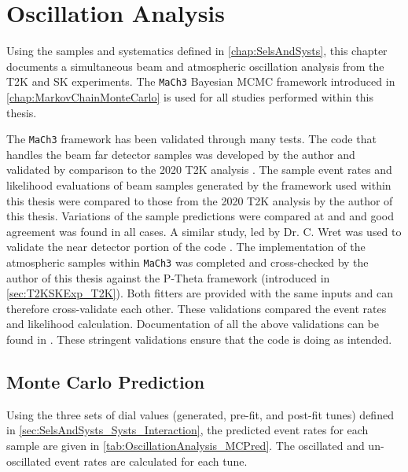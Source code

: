 \chapter{Oscillation Analysis}
\label{chap:OscillationAnalysis}

Using the samples and systematics defined in \autoref{chap:SelsAndSysts}, this chapter documents a simultaneous beam and atmospheric oscillation analysis from the T2K and SK experiments. The \texttt{MaCh3} Bayesian MCMC framework introduced in \autoref{chap:MarkovChainMonteCarlo} is used for all studies performed within this thesis.

The \texttt{MaCh3} framework has been validated through many tests. The code that handles the beam far detector samples was developed by the author and validated by comparison to the 2020 T2K analysis \cite{Dunne2020-uf}. The sample event rates and likelihood evaluations of beam samples generated by the framework used within this thesis were compared to those from the 2020 T2K analysis by the author of this thesis. Variations of the sample predictions were compared at \quickmath{\pm 1 \sigma} and \quickmath{\pm 3 \sigma} and good agreement was found in all cases. A similar study, led by Dr. C. Wret was used to validate the near detector portion of the code \cite{t2k_tn_426}. The implementation of the atmospheric samples within \texttt{MaCh3} was completed and cross-checked by the author of this thesis against the P-Theta framework (introduced in \autoref{sec:T2KSKExp_T2K}). Both fitters are provided with the same inputs and can therefore cross-validate each other. These validations compared the event rates and likelihood calculation. Documentation of all the above validations can be found in \cite{t2k_tn_426}. These stringent validations ensure that the code is doing as intended.

\section{Monte Carlo Prediction}
\label{sec:OscillationAnalysis_MonteCarloPred}

Using the three sets of dial values (generated, pre-fit, and post-fit tunes) defined in \autoref{sec:SelsAndSysts_Systs_Interaction}, the predicted event rates for each sample are given in \autoref{tab:OscillationAnalysis_MCPred}. %
The oscillated and un-oscillated event rates are calculated for each tune.

